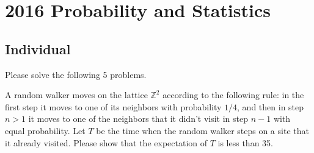 \section{2016 Probability and Statistics}

\subsection{Individual}
Please solve the following 5 problems.

\begin{exercise}\label{probability:2016:1}
A random walker moves on the lattice $\mathbb{Z}^2$ according to the following rule: in the first step it moves to one of its neighbors with probability $1/4$, and then in step $n > 1$ it moves to one of the neighbors that it didn't visit in step $n-1$ with equal probability. Let $T$ be the time when the random walker steps on a site that it already visited. Please show that the expectation of $T$ is less than 35.
\end{exercise}

